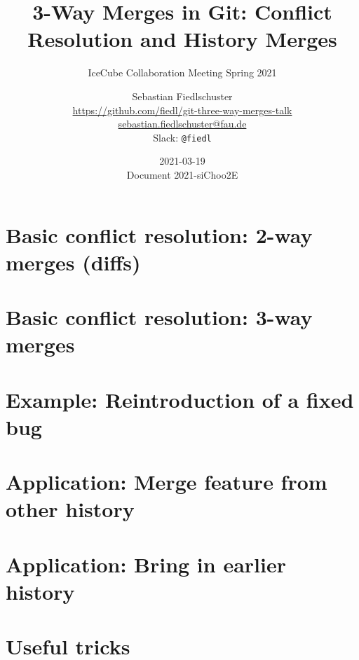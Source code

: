 \documentclass{beamer}
\title{3-Way Merges in Git: Conflict Resolution and History Merges}
\subtitle{IceCube Collaboration Meeting Spring 2021}
\date{2021-03-19 \\ \vspace*{2mm}\tiny{Document 2021-siChoo2E} \normalsize}
\author[Sebastian Fiedlschuster]{Sebastian Fiedlschuster \vspace*{0.5em} \\ \small\url{https://github.com/fiedl/git-three-way-merges-talk} \\
\footnotesize\url{sebastian.fiedlschuster@fau.de} \\
\footnotesize Slack: \texttt{@fiedl}}
\institute{Erlangen Centre for Astroparticle Physics}
\newif\ifplacelogo %
\begin{document}



\placelogofalse

\newcommand\done{\checkmark\xspace}
\newcommand\inprogress{$\Rightarrow$\xspace}
\newcommand\tobedone{$\square$\xspace}

\newcommand\question[1]{\colorbox{blue!10}{\fbox{\ \ \questionicon \ \ #1}}}

\newcommand\relates{$\mathrel{\widehat{=}}$}





\section{Basic conflict resolution: 2-way merges (diffs)}


\section{Basic conflict resolution: 3-way merges}


\section{Example: Reintroduction of a fixed bug}


\section{Application: Merge feature from other history}


\section{Application: Bring in earlier history}


\section{Useful tricks}







\end{document}
